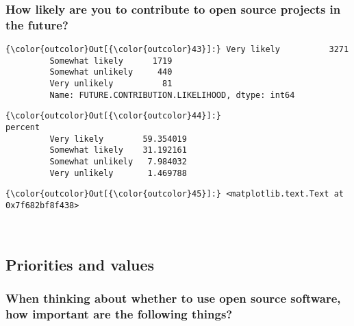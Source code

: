 \documentclass[11pt]{article}
\begin{document}
    \subsubsection{How likely are you to contribute to open source projects
in the
future?}\label{how-likely-are-you-to-contribute-to-open-source-projects-in-the-future}


            \begin{Verbatim}[commandchars=\\\{\}]
{\color{outcolor}Out[{\color{outcolor}43}]:} Very likely          3271
         Somewhat likely      1719
         Somewhat unlikely     440
         Very unlikely          81
         Name: FUTURE.CONTRIBUTION.LIKELIHOOD, dtype: int64
\end{Verbatim}
        

            \begin{Verbatim}[commandchars=\\\{\}]
{\color{outcolor}Out[{\color{outcolor}44}]:}                      percent
         Very likely        59.354019
         Somewhat likely    31.192161
         Somewhat unlikely   7.984032
         Very unlikely       1.469788
\end{Verbatim}
        

            \begin{Verbatim}[commandchars=\\\{\}]
{\color{outcolor}Out[{\color{outcolor}45}]:} <matplotlib.text.Text at 0x7f682bf8f438>
\end{Verbatim}
        
    \begin{center}
    \end{center}
    { \hspace*{\fill} \\}
    
    \subsection{Priorities and values}\label{priorities-and-values}

    \subsubsection{When thinking about whether to use open source software,
how important are the following
things?}\label{when-thinking-about-whether-to-use-open-source-software-how-important-are-the-following-things}
\end{document}
